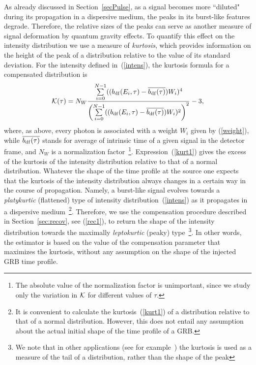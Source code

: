 \documentclass[12pt]{article}
\newcommand{\beq}{\begin{equation}}
\newcommand{\eeq}{\end{equation}}
\begin{document}
{As already discussed in Section~\ref{secPulse}, as a signal becomes more ``diluted" during its propagation in a dispersive medium,
the peaks  in its burst-like features degrade. Therefore, the relative sizes of the peaks can serve as another measure of signal deformation
by quantum gravity effects. To quantify this effect on the intensity distribution we use a measure of  {\it kurtosis},
which provides information on the height of the peak of a distribution relative to the value of its standard deviation.
For the intensity defined in~(\ref{intens}), the kurtosis formula
for a compensated distribution is
\beq
\label{kurt1}
{\cal K(\tau )} = N_W\frac{\sum\limits_{i=0}^{N-1}((b_{\rm df}(E_i,\tau )-\overline{b_{\rm df}(\tau )})W_i)^4}
{\left(\sum\limits_{i=0}^{N-1}((b_{\rm df}(E_i,\tau )-\overline{b_{\rm df}(\tau )})W_i)^2\right)^2}-3,
\eeq
where, as above, every photon is associated with a weight $W_i$ given by (\ref{weight}), while $\overline{b_{\rm df}(\tau )}$
stands for average of intrinsic time
of a given signal in the detector frame, and $N_W$ is a normalization
factor~\footnote{The absolute value of the normalization factor is unimportant, since we study only the variation in ${\cal K}$
for different values of $\tau $.}.
Expression~(\ref{kurt1}) gives the excess of the kurtosis of the intensity distribution relative
to that of a normal distribution.
{Whatever the shape of the time profile at the source one expects that the
kurtosis of the intensity distribution always changes in a certain way in the course of propagation.}
{Namely,} a burst-like signal evolves towards a {\it platykurtic} (flattened) type
of intensity distribution~(\ref{intens}) as it propagates in a dispersive medium~\footnote{It is convenient to calculate the kurtosis~(\ref{kurt1}) of
a distribution relative to that of a normal distribution. However, this does not entail any assumption about the actual initial
shape of the time profile of a GRB.}.
{Therefore,} we use the compensation procedure described in Section~\ref{sec:recov}, see (\ref{rec1}),
to return the shape of the intensity distribution towards the maximally {\it leptokurtic} (peaky)
type~\footnote{We note that in other applications (see for example~\cite{KurtPeak}) the kurtosis
is used as a measure of the tail of a distribution,
rather than the shape of the peak}. {In other words, the estimator is based on the value of the compensation
parameter that maximizes the kurtosis, without any assumption on the shape of
the injected GRB time profile.}

}
\end{document}
